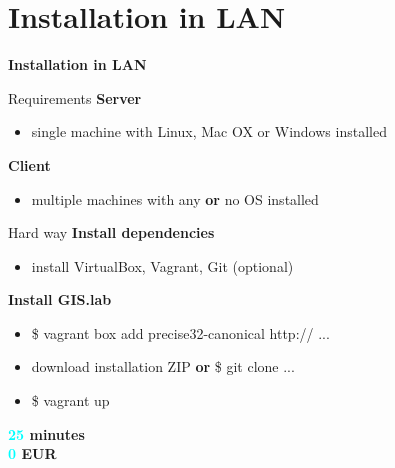 \documentclass[12pt]{beamer}
\begin{document}
\section{Installation in LAN}
\begin{frame}
	\begin{center}
		\LARGE\textbf{Installation in LAN}	
	\end{center}
\end{frame}


\begin{frame}{Requirements}
	\textbf{Server}
	\begin{itemize}
		\item single machine with Linux, Mac OX or Windows installed
	\end{itemize}
	
	\textbf{Client}
	\begin{itemize}
		\item multiple machines with any \textbf{or} no OS installed
	\end{itemize}
\end{frame}


\begin{frame}{Hard way}
	\textbf{Install dependencies}
	\begin{itemize}
		\item install VirtualBox, Vagrant, Git (optional)
	\end{itemize}

	\textbf{Install GIS.lab}
	\begin{itemize}
		\item \$ vagrant box add precise32-canonical http:// ...
		\item download installation ZIP \textbf{or} \$ git clone ...
		\item \$ vagrant up
	\end{itemize}
	\begin{flushleft}
		\textbf{\textcolor{Cyan}{25} minutes} \\
		\textbf{\textcolor{Cyan}{0} EUR} \\
	\end{flushleft}
\end{frame}
\end{document}
